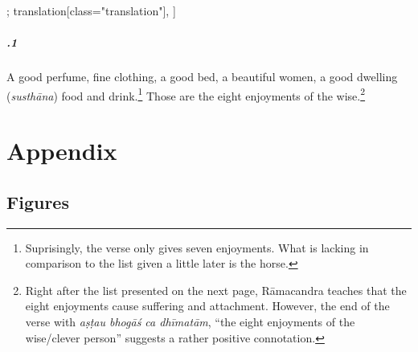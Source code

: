 \begin{alignment}[
  texts=edition[class="edition"];
  translation[class="translation"],
  ]
\begin{translation}
\begin{tlate}[22_1]
  \paragraph{.1} A good perfume, fine clothing, a good bed, a beautiful women, a good dwelling (\textit{susthāna}) food and drink.\footnote{Suprisingly, the verse only gives seven enjoyments. What is lacking in comparison to the list given a little later is the horse.} Those are the eight enjoyments of the wise.\footnote{Right after the list presented on the next page, Rāmacandra teaches that the eight enjoyments cause suffering and attachment. However, the end of the verse with \textit{aṣṭau bhogāś ca dhīmatām}, ``the eight enjoyments of the wise/clever person'' suggests a rather positive connotation.}
    \end{tlate}
  \end{translation}
\end{alignment}
\pagebreak %
\chapter{Appendix}
\section{Figures}

